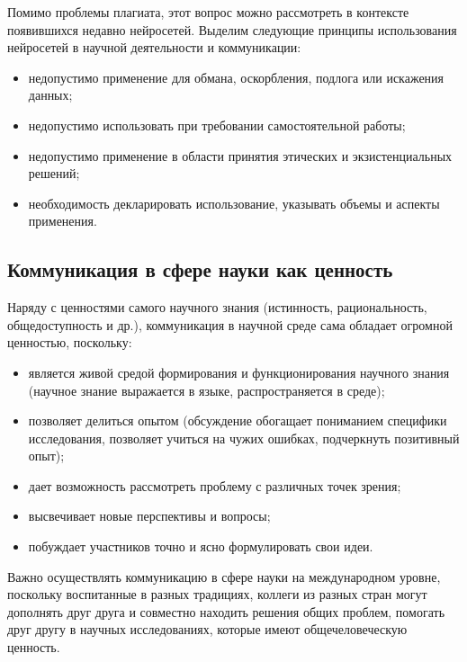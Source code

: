 Помимо проблемы плагиата, этот вопрос можно рассмотреть в контексте появившихся недавно нейросетей. Выделим следующие принципы использования нейросетей в научной деятельности и коммуникации:
\begin{itemize}
    \item недопустимо применение для обмана, оскорбления, подлога или искажения данных;
    \item недопустимо использовать при требовании самостоятельной работы;
    \item недопустимо применение в области принятия этических и экзистенциальных решений;
    \item необходимость декларировать использование, указывать объемы и аспекты применения.
\end{itemize}

\subsection{Коммуникация в сфере науки как ценность}

Наряду с ценностями самого научного знания (истинность, рациональность, общедоступность и др.), коммуникация в научной среде сама обладает огромной ценностью, поскольку:
\begin{itemize}
    \item является живой средой формирования и функционирования научного знания
    (научное знание выражается в языке, распространяется в среде);
    \item позволяет делиться опытом (обсуждение обогащает пониманием специфики исследования, позволяет учиться на чужих ошибках, подчеркнуть позитивный опыт);
    \item дает возможность рассмотреть проблему с различных точек зрения;
    \item высвечивает новые перспективы и вопросы;
    \item побуждает участников точно и ясно формулировать свои идеи.
\end{itemize}
Важно осуществлять коммуникацию в сфере науки на международном уровне,
поскольку воспитанные в разных традициях, коллеги из разных стран могут дополнять друг 
друга и совместно находить решения общих проблем, помогать друг другу в научных исследованиях, которые имеют общечеловеческую ценность. 


